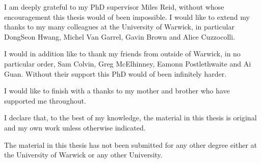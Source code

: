 \documentclass[12pt,a4paper]{book}      %
\theoremstyle{definition}
\begin{document}
\thesistitlecolourpage           %


\tableofcontents                     %

\begin{thesisacknowledgments}        %

I am deeply grateful to my PhD supervisor Miles Reid, without whose encouragement this thesis would of been impossible. I would like to extend my thanks to my many colleagues at the University of Warwick, in particular DongSeon Hwang, Michel Van Garrel, Gavin Brown and Alice Cuzzocolli. 

I would in addition like to thank my friends from outside of Warwick, in no particular order, Sam Colvin, Greg McElhinney, Eamonn Postlethwaite and Ai Guan. Without their support this PhD would of been infinitely harder. 

I would like to finish with a thanks to my mother and brother who have supported me throughout.
\end{thesisacknowledgments}

\begin{thesisdeclaration}        %
I declare that, to the best of my knowledge, the material in this thesis is original and my own work unless otherwise indicated. 

The material in this thesis has not been submitted for any other degree either at the University of Warwick or any other University.
\end{thesisdeclaration}
\end{document}
